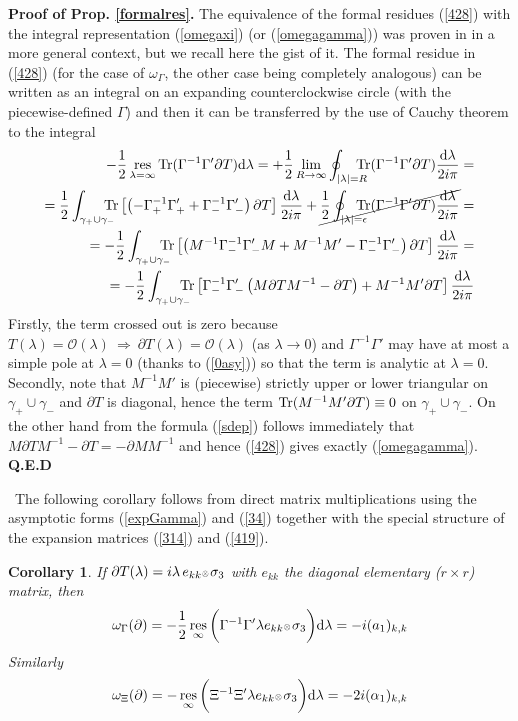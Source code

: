 \documentclass{article}
\newtheorem{cor}{Corollary}[section]
\def\ot{\hbox{\resizebox{6pt}{!}{$ \otimes \,
$}}}
\def\s{\sigma}
\def\d{{\rm d}}
\def\a{{\alpha}}
\def \pa{\partial}
\def\bea{\begin{eqnarray}}
\def\eea{\end{eqnarray}}
\def\res{\mathop{{\rm res}}}
\def\Tr{\mathop{{\rm Tr}}}
\def\QED{ {\bf Q.E.D}\par \vskip 4pt}
\newcommand{\be}{\begin{eqnarray}}
\newcommand{\ee}{\end{eqnarray}}
\def\le{\left}
\def\ri{\right}
\begin{document}
{\bf Proof of Prop. \ref{formalres}.}
The equivalence of the formal residues  (\ref{428}) with the integral representation (\ref{omegaxi})  (or (\ref{omegagamma})) was proven in \cite{BertolaIsoTau} in a more general context, but we recall here the gist of it.
The formal residue in (\ref{428}) (for the case of $\omega_\Gamma$, the other case being completely analogous) can be written as an integral on an  expanding counterclockwise circle (with the piecewise-defined $\Gamma$) and then it  can be transferred by the use of Cauchy theorem to the integral 
\bea
-\frac 12 \res_{\lambda=\infty} \Tr (\Gamma^{-1} \Gamma' \pa T) \d\lambda=
+
\frac 1 2 \lim_{R\to \infty} \oint_{|\lambda|=R}   \hspace{-10pt}
\Tr (\Gamma^{-1} \Gamma' \pa T)\frac{ \d\lambda}{2i\pi}   =\\
= 
\frac 1 2 \int_{\gamma_+\cup \gamma_-} \hspace{-10pt}\Tr \le[\le(
-\Gamma_{+}^{-1} 
\Gamma_{+ }' + \Gamma_{-}^{-1} \Gamma_{-}
' \ri)\pa T\ri]\frac{ \d\lambda}{2i\pi}  
+
\cancel{ \frac 1 2 \oint_{|\lambda|=\epsilon}   \hspace{-10pt}
\Tr (\Gamma^{-1} \Gamma' \pa T)\frac{ \d\lambda}{2i\pi} } 
=\\
=-\frac 1 2 \int_{\gamma_+\cup \gamma_-} \hspace{-10pt}
\Tr \le[\le(  
 M^{-1} \Gamma_-^{-1} \Gamma_-' M +
 M^{-1} M' -  \Gamma_-^{-1} \Gamma_-'  \ri)\pa T\ri]\frac{ \d\lambda}{2i\pi} =\cr
=-\frac 1 2 \int_{\gamma_+\cup \gamma_-} \hspace{-10pt}\Tr \le[
 \Gamma_-^{-1} \Gamma_-' \le(  M \pa T M ^{-1} -\pa T \ri) 
+
  M^{-1} M'  \pa T\ri]\frac{ \d\lambda}{2i\pi} \label{414}
\eea
Firstly, the term crossed out is zero because $T(\lambda)=\mathcal O(\lambda) \ \Rightarrow\ \pa T(\lambda)=\mathcal O(\lambda)$ (as $\lambda\to 0$) and $\Gamma^{-1}\Gamma'$ may have at most a simple pole at $\lambda=0$ (thanks to (\ref{0asy})) so that the term is analytic at $\lambda=0$.
Secondly, note that $M^{-1} M'$ is (piecewise) strictly upper or lower triangular on $\gamma_+\cup \gamma_-$ and $\pa T $ is diagonal, hence the term $\Tr (M^{-1} M' \pa T)\equiv 0$ on $\gamma_+\cup \gamma_-$. On the other hand from  the formula (\ref{sdep}) follows immediately that 
$
M \pa T M^{-1} -\pa T   = -\pa M M^{-1} 
$
and hence (\ref{428}) gives exactly (\ref{omegagamma}).  \QED\
The following corollary follows from direct matrix multiplications using the asymptotic forms (\ref{expGamma}) and (\ref{34}) together with the special structure of the expansion matrices (\ref{314}) and (\ref{419}).
\begin{cor}
\label{corsimple}
If $\pa T(\lambda) =i \lambda\, e_{kk}\ot \s_3$ with $e_{kk}$ the diagonal elementary ($r\times r$) matrix,  then 
\be
\omega_\Gamma (\pa) = -\frac 1 2 \res_{\infty} \bigg(\Gamma^{-1} \Gamma' \lambda e_{kk}\ot \s_3\bigg)\d\lambda =-{i} (a_1)_{k,k}
\ee
Similarly 
\be
\omega_\Xi (\pa) = - \res_{\infty} \bigg(\Xi^{-1} \Xi ' \lambda e_{kk}\ot \s_3\bigg)\d\lambda = -2 i (\a_1)_{k,k}
\ee
\end{cor}
\end{document}
